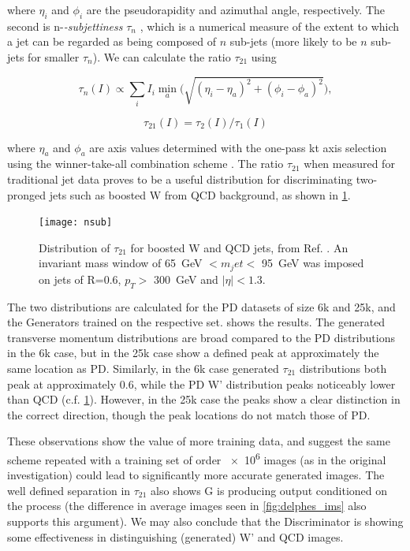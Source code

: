 \documentclass[twocolumn]{article}
\newcommand{\gev}{\giga\electronvolt}
\begin{document}
where $\eta_i$ and $\phi_i$ are the pseudorapidity and azimuthal angle, respectively. The second is n-\textit{-subjettiness} $\tau_{n}$ \cite{nsubjettiness}, which is a numerical measure of the extent to which a jet can be regarded as being composed of $n$ sub-jets (more likely to be $n$ sub-jets for smaller $\tau_n$). We can calculate the ratio $\tau_{21}$ using

$$
\tau_n (I) \propto \sum_i I_i \min_a \bigg(\sqrt{(\eta_i - \eta_a)^2 + (\phi_i - \phi_a)^2}\bigg),
$$

$$
\tau_{21} (I) = \tau_2 (I) / \tau_1 (I)
$$

where $\eta_a$ and $\phi_a$ are axis values determined with the one-pass kt axis selection using the winner-take-all combination scheme \cite{axis}. The ratio $\tau_{21}$ when measured for traditional jet data proves to be a useful distribution for discriminating two-pronged jets such as boosted W from QCD background, as shown in \cref{fig:nsub}.

\begin{figure}[H]
	\centering
	\texttt{[image: nsub]}
	
	\caption{Distribution of $\tau_{21}$ for boosted W and QCD jets, from Ref. \cite{nsubjettiness}. An invariant mass window of \SI{65}{\gev} $< m_jet <$ \SI{95}{\gev} was imposed on jets of R=0.6, $p_T >$ \SI{300}{\gev} and $|\eta| < 1.3$.}
	\label{fig:nsub}
	
\end{figure}

The two distributions are calculated for the PD datasets of size 6k and 25k, and the Generators trained on the respective set.  shows the results. The generated transverse momentum distributions are broad compared to the PD distributions in the 6k case, but in the 25k case show a defined peak at approximately the same location as PD. Similarly, in the 6k case generated $\tau_{21}$ distributions both peak at approximately 0.6, while the PD W' distribution peaks noticeably lower than QCD (c.f. \cref{fig:nsub}). However, in the 25k case the peaks show a clear distinction in the correct direction, though the peak locations do not match those of PD. 

These observations show the value of more training data, and suggest the same scheme repeated with a training set of order \num{e6} images (as in the original investigation) could lead to significantly more accurate generated images. The well defined separation in $\tau_{21}$ also shows G is producing output conditioned on the process (the difference in average images seen in \cref{fig:delphes_ims} also supports this argument). We may also conclude that the Discriminator is showing some effectiveness in distinguishing (generated) W' and QCD images. 
\end{document}
